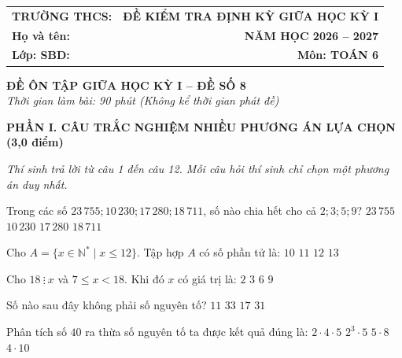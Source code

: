 \documentclass[12pt,a4paper]{article}
\begin{document}
\noindent
\begin{tabularx}{\linewidth}{X r}
\textbf{TRƯỜNG THCS: \dotfill} & \textbf{ĐỀ KIỂM TRA ĐỊNH KỲ GIỮA HỌC KỲ I} \\
\textbf{Họ và tên: \dotfill} & \textbf{NĂM HỌC 2026 -- 2027} \\
\textbf{Lớp: \dotfill \quad SBD: \dotfill} & \textbf{Môn: TOÁN 6} \\
\hline
\end{tabularx}
\vspace{2mm}

\begin{center}
  \textbf{\large ĐỀ ÔN TẬP GIỮA HỌC KỲ I -- ĐỀ SỐ 8}\\
  \textit{Thời gian làm bài: 90 phút (Không kể thời gian phát đề)}
\end{center}
\vspace{1mm}

\noindent\textbf{\large PHẦN I. CÂU TRẮC NGHIỆM NHIỀU PHƯƠNG ÁN LỰA CHỌN (3,0 điểm)}

\textit{Thí sinh trả lời từ câu 1 đến câu 12. Mỗi câu hỏi thí sinh chỉ chọn một phương án duy nhất.}

\vspace{1mm}
\begin{ex}
Trong các số $23\,755; 10\,230; 17\,280; 18\,711$, số nào chia hết cho cả $2; 3; 5; 9$?
\choice
{$23\,755$}
{$10\,230$}
{\True $17\,280$}
{$18\,711$}
\end{ex}

\begin{ex}
Cho $A = \{x \in \mathbb{N}^* \mid x \le 12\}$. Tập hợp $A$ có số phần tử là:
\choice
{$10$}
{$11$}
{\True $12$}
{$13$}
\end{ex}

\begin{ex}
Cho $18 \ \vdots \ x$ và $7 \le x < 18$. Khi đó $x$ có giá trị là:
\choice
{$2$}
{$3$}
{$6$}
{\True $9$}
\end{ex}

\begin{ex}
Số nào sau đây không phải số nguyên tố?
\choice
{$11$}
{\True $33$}
{$17$}
{$31$}
\end{ex}

\begin{ex}
Phân tích số $40$ ra thừa số nguyên tố ta được kết quả đúng là:
\choice
{$2 \cdot 4 \cdot 5$}
{\True $2^3 \cdot 5$}
{$5 \cdot 8$}
{$4 \cdot 10$}
\end{ex}
\end{document}
